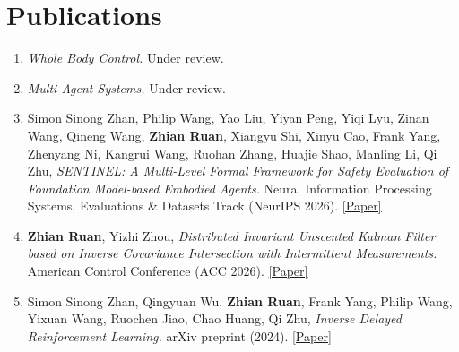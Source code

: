 \documentclass[10pt,letterpaper]{article}
\newcommand{\me}{\textbf{Zhian Ruan}}
\newcommand{\paper}[1]{\href{#1}{[Paper]}}
\begin{document}
\section{Publications}
\begin{enumerate}[leftmargin=2.6em,itemsep=0.5em,topsep=0pt]
  \item \textit{Whole Body Control.} Under review.
  \item \textit{Multi-Agent Systems.} Under review.
  \item Simon Sinong Zhan, Philip Wang, Yao Liu, Yiyan Peng, Yiqi Lyu, Zinan Wang, Qineng Wang,
        \me, Xiangyu Shi, Xinyu Cao, Frank Yang, Zhenyang Ni, Kangrui Wang, Ruohan Zhang, Huajie Shao,
        Manling Li, Qi Zhu, \textit{SENTINEL: A Multi-Level Formal Framework for Safety Evaluation of
        Foundation Model-based Embodied Agents.} Neural Information Processing Systems, Evaluations \&
        Datasets Track (NeurIPS 2026). \paper{https://arxiv.org/abs/2510.12985}
  \item \me, Yizhi Zhou, \textit{Distributed Invariant Unscented Kalman Filter based on Inverse
        Covariance Intersection with Intermittent Measurements.} American Control Conference (ACC 2026).
        \paper{https://arxiv.org/abs/2409.17997}
  \item Simon Sinong Zhan, Qingyuan Wu, \me, Frank Yang, Philip Wang, Yixuan Wang, Ruochen Jiao,
        Chao Huang, Qi Zhu, \textit{Inverse Delayed Reinforcement Learning.} arXiv preprint (2024).
        \paper{https://arxiv.org/abs/2412.02931}
\end{enumerate}
\end{document}
